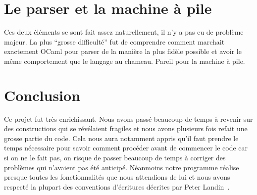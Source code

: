 \documentclass[10pt,a4paper]{article}
\begin{document}
\section{Le parser et la machine à pile}
Ces deux éléments se sont fait assez naturellement, il n'y a pas eu de problème majeur. La plus ``grosse difficulté'' fut de comprendre comment marchait exactement OCaml pour parser de la manière la plus fidèle possible et avoir le même comportement que le langage au chameau. Pareil pour la machine à pile.

\section{Conclusion}
Ce projet fut très enrichissant. Nous avons passé beaucoup de temps à revenir sur des constructions qui se révélaient fragiles et nous avons plusieurs fois refait une grosse partie du code. Cela nous aura notamment appris qu'il faut prendre le temps nécessaire pour savoir comment procéder avant de commencer le code car si on ne le fait pas, on risque de passer beaucoup de temps à corriger des problèmes qui n'avaient pas été anticipé. Néanmoins notre programme réalise presque toutes les fonctionnalités que nous attendions de lui et nous avons respecté la plupart des conventions d'écritures décrites par Peter Landin~\cite{landin66}.



\end{document}
